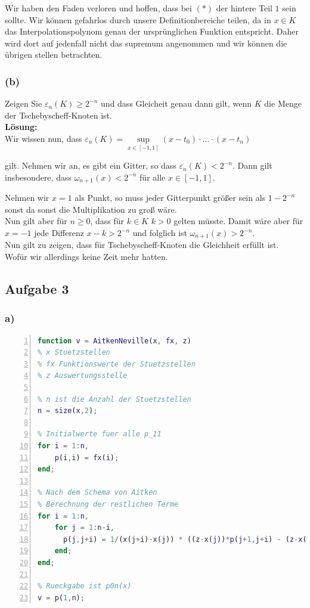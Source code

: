 \documentclass[11pt,a4paper,ngerman]{article}
\begin{document}
Wir haben den Faden verloren und hoffen, dass bei $(*)$ der hintere
Teil $1$ sein sollte. Wir können gefahrlos durch unsere Definitionbereiche
teilen, da in $x \in K$ das Interpolationspolynom genau der ursprünglichen
Funktion entspricht. Daher wird dort auf jedenfall nicht das supremum
angenommen und wir können die übrigen stellen betrachten.

\subsubsection*{(b)}

Zeigen Sie $\varepsilon_n(K) \geq 2^{-n}$ und dass Gleicheit genau dann gilt, wenn $K$ die Menge
der Tschebyscheff-Knoten ist.\\

\textbf{Lösung:}\\

Wir wissen nun, dass
$\varepsilon_n(K) = \underset{x \in [-1,1]}{\sup} (x-t_0)\cdot ... \cdot(x - t_n)$
  
gilt. Nehmen wir an, es gibt ein Gitter, so dass
$\varepsilon_n(K) < 2^{-n}$. Dann gilt insbesondere, dass
$\omega_{n+1} (x) < 2^{-n}$ für alle $x \in [-1,1]$.

Nehmen wir $x=1$ als Punkt, so muss jeder Gitterpunkt
größer sein als
$1-2^{-n}$ sonst da sonst die Multiplikation zu groß wäre.\\
Nun gilt aber für $n\geq0$, dass für $k \in K$ $k > 0$ gelten müsste.
Damit wäre aber für $x = -1$ jede Differenz $x-k > 2^{-n}$ und folglich
ist $\omega_{n+1}(x) > 2^{-n}$.\\

Nun gilt zu zeigen, dass für Tschebyscheff-Knoten die Gleichheit erfüllt ist.\\

Wofür wir allerdings keine Zeit mehr hatten.

\subsection*{Aufgabe 3}


\subsubsection*{a)}
\begin{lstlisting}[language=matlab,numbers=left]
function v = AitkenNeville(x, fx, z)
% x Stuetzstellen
% fx Funktionswerte der Stuetzstellen
% z Auswertungsstelle

% n ist die Anzahl der Stuetzstellen
n = size(x,2);

% Initialwerte fuer alle p_11
for i = 1:n,
    p(i,i) = fx(i);
end;

% Nach dem Schema von Aitken
% Berechnung der restlichen Terme
for i = 1:n,
    for j = 1:n-i,
      p(j,j+i) = 1/(x(j+i)-x(j)) * ((z-x(j))*p(j+1,j+i) - (z-x(j+i))*p(j,j+i-1));
    end;
end;

% Rueckgabe ist p0n(x)
v = p(1,n);
\end{lstlisting}
\end{document}
